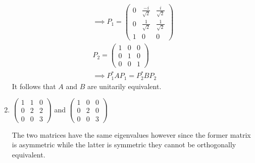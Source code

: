 \begin{enumerate}
\begin{gather}
\implies P_1 = \begin{pmatrix}
0 & \frac{-i}{\sqrt{2}} & \frac{i}{\sqrt{2}}\\
0 & \frac{1}{\sqrt{2}} & \frac{1}{\sqrt{2}}\\
1 & 0 & 0
\end{pmatrix}\\
P_2 = \begin{pmatrix}
1 & 0 & 0\\
0 & 1 & 0\\
0 & 0 & 1
\end{pmatrix}\\
\implies P_1^*AP_1 = P_2^*BP_2
\end{gather}
It follows that $A$ and $B$ are unitarily equivalent.
\item $\begin{pmatrix}
1 & 1 & 0\\
0 & 2 & 2\\
0 & 0 & 3
  \end{pmatrix}$
and 
$
\begin{pmatrix}
1 & 0 & 0\\
0 & 2 & 0\\
0 & 0 & 3
\end{pmatrix}$

The two matrices have the same eigenvalues however since the former
matrix is asymmetric while the latter is symmetric they cannot be
orthogonally equivalent.
\end{enumerate}

